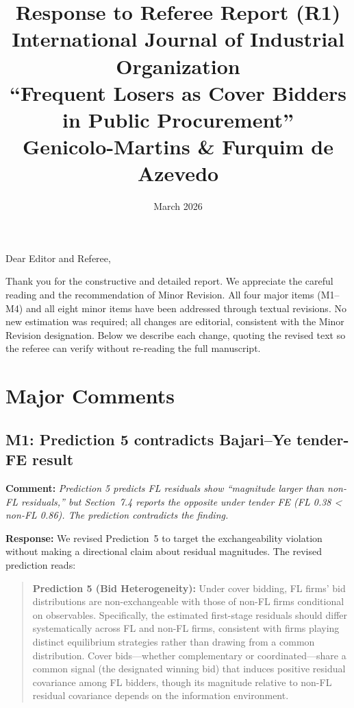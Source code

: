 \documentclass[12pt]{article}
\title{Response to Referee Report (R1)\\[6pt]
\large International Journal of Industrial Organization\\[4pt]
\large ``Frequent Losers as Cover Bidders in Public Procurement''\\
\large Genicolo-Martins \& Furquim de Azevedo}
\author{}
\date{March 2026}
\newcommand{\referee}[1]{\medskip\noindent\textbf{Comment:} \textit{#1}\medskip}
\newcommand{\response}[1]{\noindent\textbf{Response:} #1}
\begin{document}
\maketitle

\noindent Dear Editor and Referee,

Thank you for the constructive and detailed report. We appreciate the
careful reading and the recommendation of Minor Revision. All four major
items (M1--M4) and all eight minor items have been addressed through
textual revisions. No new estimation was required; all changes are
editorial, consistent with the Minor Revision designation. Below we
describe each change, quoting the revised text so the referee can verify
without re-reading the full manuscript.

\bigskip

\section*{Major Comments}

\subsection*{M1: Prediction 5 contradicts Bajari--Ye tender-FE result}

\referee{Prediction 5 predicts FL residuals show ``magnitude larger than
non-FL residuals,'' but Section~7.4 reports the opposite under tender FE
(FL 0.38 < non-FL 0.86). The prediction contradicts the finding.}

\response{We revised Prediction~5 to target the exchangeability violation
without making a directional claim about residual magnitudes. The revised
prediction reads:}

\begin{quote}
\textbf{Prediction 5 (Bid Heterogeneity):} Under cover bidding, FL
firms' bid distributions are non-exchangeable with those of non-FL firms
conditional on observables. Specifically, the estimated first-stage
residuals should differ systematically across FL and non-FL firms,
consistent with firms playing distinct equilibrium strategies rather than
drawing from a common distribution. Cover bids---whether complementary or
coordinated---share a common signal (the designated winning bid) that
induces positive residual covariance among FL bidders, though its
magnitude relative to non-FL residual covariance depends on the
information environment.
\end{quote}
\end{document}
